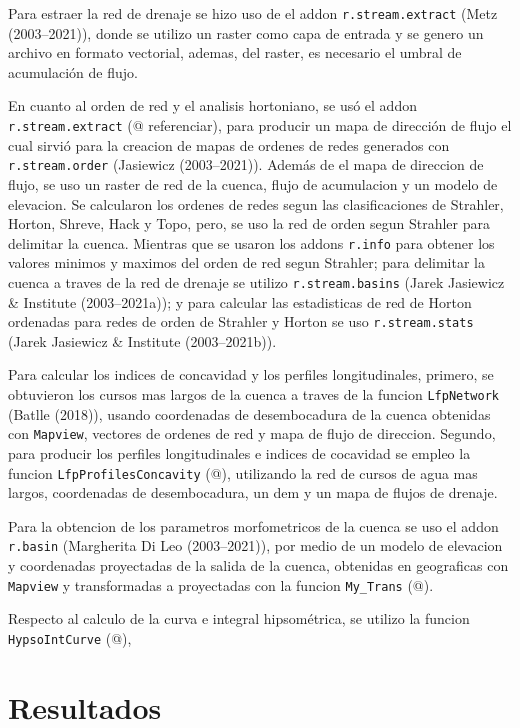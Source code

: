 \documentclass[11pt,]{article}
\begin{document}
Para estraer la red de drenaje se hizo uso de el addon
\texttt{r.stream.extract} (Metz (2003--2021)), donde se utilizo un
raster como capa de entrada y se genero un archivo en formato vectorial,
ademas, del raster, es necesario el umbral de acumulación de flujo.

En cuanto al orden de red y el analisis hortoniano, se usó el addon
\texttt{r.stream.extract} (@ referenciar), para producir un mapa de
dirección de flujo el cual sirvió para la creacion de mapas de ordenes
de redes generados con \texttt{r.stream.order} (Jasiewicz (2003--2021)).
Además de el mapa de direccion de flujo, se uso un raster de red de la
cuenca, flujo de acumulacion y un modelo de elevacion. Se calcularon los
ordenes de redes segun las clasificaciones de Strahler, Horton, Shreve,
Hack y Topo, pero, se uso la red de orden segun Strahler para delimitar
la cuenca. Mientras que se usaron los addons \texttt{r.info} para
obtener los valores minimos y maximos del orden de red segun Strahler;
para delimitar la cuenca a traves de la red de drenaje se utilizo
\texttt{r.stream.basins} (Jarek Jasiewicz \& Institute (2003--2021a)); y
para calcular las estadisticas de red de Horton ordenadas para redes de
orden de Strahler y Horton se uso \texttt{r.stream.stats} (Jarek
Jasiewicz \& Institute (2003--2021b)).

Para calcular los indices de concavidad y los perfiles longitudinales,
primero, se obtuvieron los cursos mas largos de la cuenca a traves de la
funcion \texttt{LfpNetwork} (Batlle (2018)), usando coordenadas de
desembocadura de la cuenca obtenidas con \texttt{Mapview}, vectores de
ordenes de red y mapa de flujo de direccion. Segundo, para producir los
perfiles longitudinales e indices de cocavidad se empleo la funcion
\texttt{LfpProfilesConcavity} (@), utilizando la red de cursos de agua
mas largos, coordenadas de desembocadura, un dem y un mapa de flujos de
drenaje.

Para la obtencion de los parametros morfometricos de la cuenca se uso el
addon \texttt{r.basin} (Margherita Di Leo (2003--2021)), por medio de un
modelo de elevacion y coordenadas proyectadas de la salida de la cuenca,
obtenidas en geograficas con \texttt{Mapview} y transformadas a
proyectadas con la funcion \texttt{My\_Trans} (@).

Respecto al calculo de la curva e integral hipsométrica, se utilizo la
funcion \texttt{HypsoIntCurve} (@),

\section{Resultados}\label{resultados}
\end{document}
